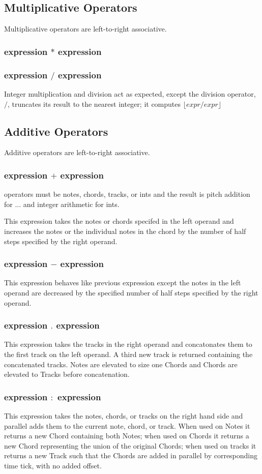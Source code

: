 \documentclass[letterpaper]{article}
\begin{document}
\subsection{Multiplicative Operators}
Multiplicative operators are left-to-right associative.
\subsubsection{expression $*$ expression}
\subsubsection{expression $/$ expression}
Integer multiplication and division act as expected, except the division operator, $/$, truncates its result to the nearest integer; it computes $\lfloor{expr / expr}\rfloor$

\subsection{Additive Operators}
Additive operators are left-to-right associative.
\subsubsection{expression $+$ expression}
operators must be notes, chords, tracks, or ints and the result is pitch addition for ... and integer arithmetic for ints.

This expression takes the notes or chords specifed in the left operand and increases the notes or the individual notes in the chord by the number of half steps specified by the right operand. 

\subsubsection{expression $-$ expression}
This expression behaves like previous expression except the notes in the left operand are decreased by the specified number of half steps specified by the right operand. 
\subsubsection{expression $.$ expression}
This expression takes the tracks in the right operand and concatonates them to the first track on the left operand. A third new track is returned containing the concatenated tracks. Notes are elevated to size one Chords and Chords are elevated to Tracks before concatenation. 
\subsubsection{expression $:$ expression}
This expression takes the notes, chords, or tracks on the right hand side and parallel adds them to the current note, chord, or track. When used on Notes it returns a new Chord containing both Notes; when used on Chords it returns a new Chord representing the union of the original Chords; when used on tracks it returns a new Track such that the Chords are added in parallel by corresponding time tick, with no added offset. 
\end{document}
